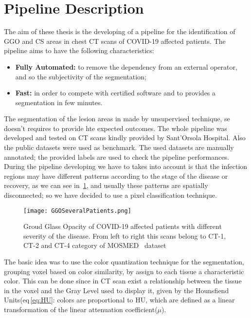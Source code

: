 
	
	\section{Pipeline Description}
	
	The aim of these thesis is the developing of a pipeline for the identification of GGO and CS areas in chest CT scans of COVID-19 affected patients. The pipeline aims to have the following characteristics:   
	\begin{itemize}
		\item  \textbf{Fully Automated: } to remove the dependency from an external operator, and so the subjectivity of the segmentation; 
		
		\item \textbf{Fast: } in order to compete with certified software and to provides a segmentation in few minutes.
	\end{itemize}
	
	The segmentation of the lesion areas in made by unsupervised technique, se doesn't requires to provide hte expected outcomes. The whole pipeline was developed and tested on CT scans kindly provided by Sant'Orsola Hospital. Also the public datasets were used as benchmark. The used datasets are manually annotated; the provided labels are used to check the pipeline performances.\\ During the pipeline developing we have to takes into account is that the infection regions may have different patterns according to the stage of the disease or recovery, as we can see in \figurename\,\ref{fig:GGO-Spatial}, and usually these patterns are spatially disconnected; so we have decided to use a pixel classification technique.\\
	
	\begin{figure}[h!]
		\centering
			\texttt{[image: GGOSeveralPatients.png]}
		\caption{Groud Glass Opacity of COVID-19 affected patients with different severity of the disease. From left to right this scans belong to CT-1, CT-2 and CT-4 category of MOSMED~\cite{DATA:MOSMED} dataset}
	\label{fig:GGO-Spatial}
	\end{figure}

	The basic idea was to use the color quantization technique for the segmentation, grouping voxel based on color similarity, by assign  to each tissue a characteristic color. This can be done since in CT scan exist a relationship between the tissue in the voxel and the Gray Level used to display it, given by the Hounsfiend Units(eq\,\ref{eq:HU}: colors are proportional to HU, which are defined as a linear transformation of the linear attenuation coefficient($\mu$).
		
